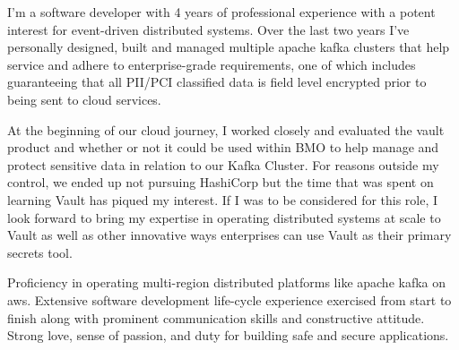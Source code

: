 \documentclass[11pt, a4paper]{awesome-cv} %
\begin{document}
\makecvheader %

\makelettertitle %


\begin{cvletter}



I'm a software developer with 4 years of professional experience with a potent interest for event-driven distributed systems. Over the last two years I've personally designed, built and managed multiple apache kafka clusters that help service and adhere to enterprise-grade requirements, one of which includes guaranteeing that all PII/PCI classified data is field level encrypted prior to being sent to cloud services.



At the beginning of our cloud journey, I worked closely and evaluated the vault product and whether or not it could be used within BMO to help manage and protect sensitive data in relation to our Kafka Cluster. For reasons outside my control, we ended up not pursuing HashiCorp but the time that was spent on learning Vault has piqued my interest. If I was to be considered for this role, I look forward to bring my expertise in operating distributed systems at scale to Vault as well as other innovative ways enterprises can use Vault as their primary secrets tool.



Proficiency in operating multi-region distributed platforms like apache kafka on aws. Extensive software development life-cycle experience exercised from start to finish along with prominent communication skills and constructive attitude. Strong love, sense of passion, and duty for building safe and secure applications. 


\end{cvletter}


\makeletterclosing %
\end{document}
